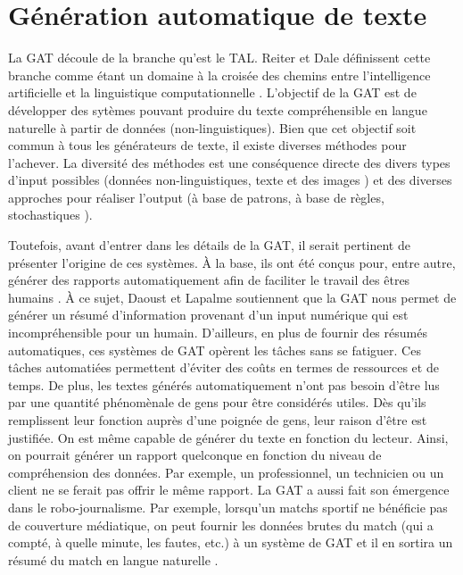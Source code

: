 
\chapter{Génération automatique de texte}


La \acf{GAT} découle de la branche qu'est le \acf{TAL}. Reiter et Dale  définissent cette branche comme étant un domaine à la croisée des chemins entre l'intelligence artificielle et la linguistique computationnelle \citep{ReiterBuildingNaturalLanguage2000}. L'objectif de la \ac{GAT} est de développer des sytèmes pouvant produire du texte compréhensible en langue naturelle à partir de données (non-linguistiques). Bien que cet objectif soit commun à tous les générateurs de texte, il existe diverses méthodes pour l'achever. La diversité des méthodes est une conséquence directe des divers types d'input possibles (données non-linguistiques, texte et des images \citep{thomason:coling14}) et des diverses approches pour réaliser l'output (à base de patrons, à base de règles, stochastiques \citep{gatt18}).

Toutefois, avant d'entrer dans les détails de la \ac{GAT}, il serait pertinent de présenter l'origine de ces systèmes. À la base, ils ont été conçus pour, entre autre, générer des rapports automatiquement afin de faciliter le travail des êtres humains \citep{ReiterBuildingNaturalLanguage2000}. À ce sujet, Daoust et Lapalme soutiennent que\cite{DaoustJSREALTextRealizer2015} la \ac{GAT} nous permet de générer un résumé d'information provenant d'un input numérique qui est incompréhensible pour un humain. D'ailleurs, en plus de fournir des résumés automatiques, ces systèmes de \ac{GAT} opèrent les tâches sans se fatiguer. Ces tâches automatiées permettent d'éviter des coûts en termes de ressources et de temps. De plus, les textes générés automatiquement n'ont pas besoin d'être lus par une quantité phénomènale de gens pour être considérés utiles. Dès qu'ils remplissent leur fonction auprès d'une poignée de gens, leur raison d'être est justifiée. On est même capable de générer du texte en fonction du lecteur. Ainsi, on pourrait générer un rapport quelconque en fonction du niveau de compréhension des données. Par exemple, un professionnel, un technicien ou un client \citep{1948c0b7a8ca42679cad977bb2cdddc2} ne se ferait pas offrir le même rapport. La \ac{GAT} a aussi fait son émergence dans le robo-journalisme. Par exemple, lorsqu'un matchs sportif ne bénéficie pas de couverture médiatique, on peut fournir les données brutes du match (qui a compté, à quelle minute, les fautes, etc.) à un système de \ac{GAT} et il en sortira un résumé du match en langue naturelle \citep{W17-3513}.

